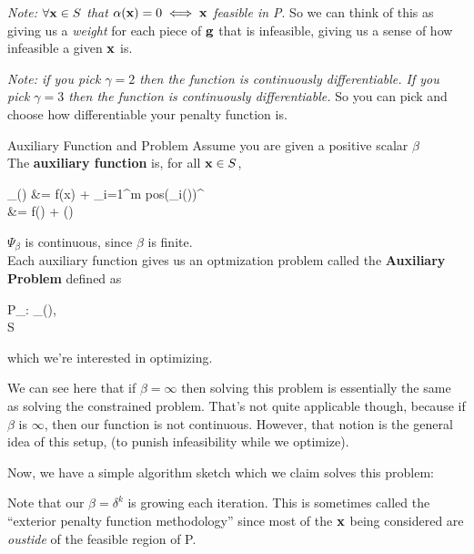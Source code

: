 \textit{Note: $\forall \mathbf{x} \in S$  that $\alpha(\mathbf{x}) = 0 \iff \mathbf{x}$ feasible in P}.
So we can think of this as giving us a \textit{weight} for each piece of $\mathbf{g}$ that
is infeasible, giving us a sense of how infeasible a given $\mathbf{x}$ is.

\textit{Note: if you pick $\gamma=2$ then the function is continuously differentiable.
If you pick $\gamma=3$ then the function is  continuously differentiable.}
So you can pick and choose how differentiable your penalty function is.

\begin{defn}{Auxiliary Function and Problem}{}
Assume you are given a positive scalar $\beta$ 
\bigskip\\
The \textbf{auxiliary function} is, for all $\mathbf{x} \in S$,
\begin{frml}
	\Psi_\beta(\vx) &= f(x) + \beta \sum_{i=1}^m pos(\vg_i(\vx))^\gamma \\ &= f(\vx) + \beta * \alpha(\vx)
\end{frml}
$\Psi_\beta$ is continuous, since $\beta$ is finite. 
\bigskip\\
Each auxiliary function gives us an optmization problem called the \textbf{Auxiliary Problem}
defined as
	\begin{frml}
		P_\beta: \min \Psi_\beta(\vx), \\ \st \vx \in S
	\end{frml}
which we're interested in optimizing.
\end{defn}

We can see here that if $\beta = \infty$ then solving this problem is essentially
the same as solving the constrained problem. That's not quite applicable though,
because if $\beta$ is $\infty$, then our function is not continuous. However,
that notion is the general idea of this setup, (to punish infeasibility while
we optimize).

Now, we have a simple algorithm sketch which we claim solves this problem:
\begin{algorithm}
\caption{Penalty Function Algorithm}
\end{algorithm}
Note that our $\beta = \delta^k$ is growing each iteration. This is sometimes
called the ``exterior penalty function methodology'' since most of the
$\mathbf{x}$ being considered are \textit{oustide} of the feasible region of P.

